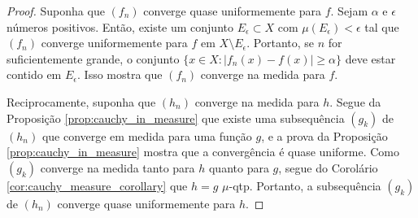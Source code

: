 \begin{proof}
    Suponha que $(f_n)$ converge quase uniformemente para $f$. Sejam $\alpha$ e $\epsilon$ números positivos. Então, existe um conjunto $E_\epsilon \subset X$ com $\mu(E_\epsilon) < \epsilon$ tal que $(f_n)$ converge uniformemente para $f$ em $X \setminus E_\epsilon$. Portanto, se $n$ for suficientemente grande, o conjunto $\{x \in X : |f_n(x) - f(x)| \geq \alpha\}$ deve estar contido em $E_\epsilon$. Isso mostra que $(f_n)$ converge na medida para $f$.

    Reciprocamente, suponha que $(h_n)$ converge na medida para $h$. Segue da Proposição \ref{prop:cauchy_in_measure} que existe uma subsequência $(g_k)$ de $(h_n)$ que converge em medida para uma função $g$, e a prova da Proposição \ref{prop:cauchy_in_measure}  mostra que a convergência é quase uniforme. Como $(g_k)$ converge na medida tanto para $h$ quanto para $g$, segue do Corolário \ref{cor:cauchy_measure_corollary} que $h = g$ \(\mu\)-qtp. Portanto, a subsequência $(g_k)$ de $(h_n)$ converge quase uniformemente para $h$.
\end{proof}

